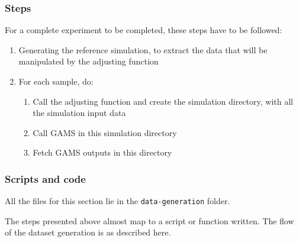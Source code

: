\subsubsection{Steps}
For a complete experiment to be completed, these steps have to be followed:
\begin{enumerate}
    \item Generating the reference simulation, to extract the data that will be manipulated by the adjusting function
    \item For each sample, do:
    \begin{enumerate}
        \item Call the adjusting function and create the simulation directory, with all the simulation input data
        \item Call GAMS in this simulation directory
        \item Fetch GAMS outputs in this directory
    \end{enumerate}
\end{enumerate}

\subsubsection{Scripts and code}

All the files for this section lie in the \texttt{data-generation} folder.

The steps presented above almost map to a script or function written. The flow of the dataset generation is as described here.

